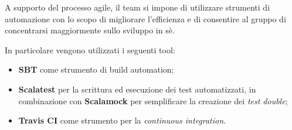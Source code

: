 A supporto del processo agile, il team si impone di utilizzare strumenti di automazione con lo scopo di migliorare l'efficienza e di consentire al gruppo di concentrarsi maggiormente sullo sviluppo in sè.

In particolare vengono utilizzati i seguenti tool:
%
\begin{itemize}
    \item \textbf{SBT} come strumento di build automation;
    \item \textbf{Scalatest} per la scrittura ed esecuzione dei test automatizzati, in combinazione con \textbf{Scalamock} per semplificare la creazione dei \textit{test double};
    \item \textbf{Travis CI} come strumento per la \textit{continuous integration}.
\end{itemize}
